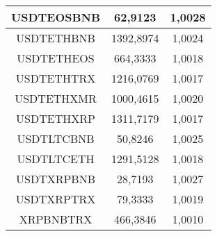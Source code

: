 \begin{table}
\begin{tabular}{|| c | c | c ||}
 \hline USDTEOSBNB & 62,9123 & 1,0028\\ 
 \hline USDTETHBNB & 1392,8974 & 1,0024\\ 
 \hline USDTETHEOS & 664,3333 & 1,0018\\ 
 \hline USDTETHTRX & 1216,0769 & 1,0017\\ 
 \hline USDTETHXMR & 1000,4615 & 1,0020\\ 
 \hline USDTETHXRP & 1311,7179 & 1,0017\\ 
 \hline USDTLTCBNB & 50,8246 & 1,0025\\ 
 \hline USDTLTCETH & 1291,5128 & 1,0018\\ 
 \hline USDTXRPBNB & 28,7193 & 1,0027\\ 
 \hline USDTXRPTRX & 79,3333 & 1,0019\\ 
 \hline XRPBNBTRX & 466,3846 & 1,0010\\ 
 \hline
\end{tabular}
\end{table}